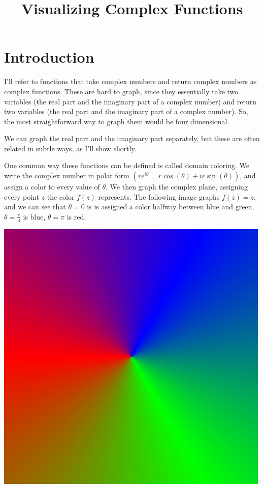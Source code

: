 \documentclass[xhtml, mathjax]{article}
\title{Visualizing Complex Functions}
\author{}
\date{}
\begin{document}
  \EndCssFile
  \section{Introduction}

  I'll refer to functions that take complex numbers and return complex numbers
  as complex functions. These are hard to graph, since they essentially take two
  variables (the real part and the imaginary part of a complex number) and
  return two variables (the real part and the imaginary part of a complex
  number). So, the most straightforward way to graph them would be four
  dimensional.

  We can graph the real part and the imaginary part separately, but these are
  often related in subtle ways, as I'll show shortly.

  One common way these functions can be defined is called domain coloring. We
  write the complex number in polar form $(re^{i\theta} = r\cos(\theta) +
  ir\sin(\theta))$, and assign a color to every value of $\theta$. We then graph the
  complex plane, assigning every point $z$ the color $f(z)$ represents. The
  following image graphs $f(z) = z$, and we can see that $\theta = 0$ is is
  assigned a color halfway between blue and green, $\theta = \frac{\pi}{3}$ is
  blue, $\theta = \pi$ is red.

  \begin{center}
    \includegraphics{z_color.gif}
  \end{center}
\end{document}
